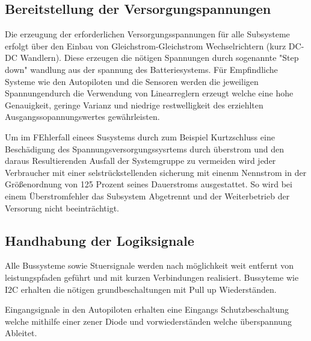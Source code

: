 \subsection{Bereitstellung der Versorgungspannungen}

Die erzeugung der erforderlichen Versorgungsspannungen für alle Subsysteme erfolgt über den Einbau von Gleichstrom-Gleichstrom Wechselrichtern (kurz DC-DC Wandlern).
Diese erzeugen die nötigen Spannungen durch sogenannte "Step down"  wandlung aus der spannung des Batteriesystems.
Für Empfindliche Systeme wie den Autopiloten und die Sensoren werden die jeweiligen Spannungendurch die Verwendung von Linearreglern erzeugt welche eine hohe Genauigkeit, geringe Varianz und niedrige restwelligkeit des erziehlten Ausgangssopannungswertes gewährleisten.

Um im FEhlerfall einees Susystems durch zum Beispiel Kurtzschluss eine Beschädigung des Spannungsversorgungssysrtems durch überstrom und den daraus Resultierenden Ausfall der Systemgruppe zu vermeiden wird jeder Verbraucher mit einer selstrückstellenden sicherung mit einenm Nennstrom in der Größenordnung von 125 Prozent seines Dauerstroms ausgestattet.
So wird bei einem Überstromfehler das Subsystem Abgetrennt und der Weiterbetrieb der Versorung nicht beeinträchtigt.


\subsection{Handhabung der Logiksignale}

Alle Bussysteme sowie Stuersignale werden nach möglichkeit weit entfernt von leistungspfaden geführt und mit kurzen Verbindungen realisiert.
Bussyteme wie I2C erhalten die nötigen grundbeschaltungen mit Pull up Wiederständen.

Eingangsignale in den Autopiloten erhalten eine Eingangs Schutzbeschaltung welche mithilfe einer zener Diode und vorwiederständen welche überspannung Ableitet.
